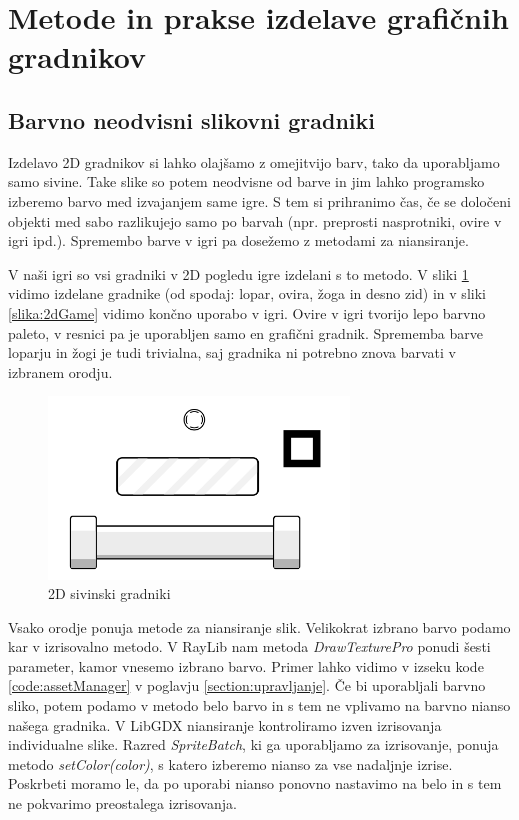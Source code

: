 \documentclass[12pt,a4paper,twoside]{book}
\begin{document}
\section{Metode in prakse izdelave grafičnih gradnikov}
\subsection{Barvno neodvisni slikovni gradniki}
Izdelavo 2D gradnikov si lahko olajšamo z omejitvijo barv, tako da uporabljamo samo sivine. Take slike so potem neodvisne od barve in jim lahko programsko izberemo barvo med izvajanjem same igre. S tem si prihranimo čas, če se določeni objekti med sabo razlikujejo samo po barvah (npr. preprosti nasprotniki, ovire v igri ipd.). Spremembo barve v igri pa dosežemo z metodami za niansiranje.

V naši igri so vsi gradniki v 2D pogledu igre izdelani s to metodo. V sliki \ref{slika:grayscaleSprites} vidimo izdelane gradnike (od spodaj: lopar, ovira, žoga in desno zid) in v sliki \ref{slika:2dGame} vidimo končno uporabo v igri. Ovire v igri tvorijo lepo barvno paleto, v resnici pa je uporabljen samo en grafični gradnik. Sprememba barve loparju in žogi je tudi trivialna, saj gradnika ni potrebno znova barvati v izbranem orodju. 

\begin{figure}[h]
	\centering
	\includegraphics[width=8cm]{grayscaleSprites}
	\caption{2D sivinski gradniki}
	\label{slika:grayscaleSprites}
\end{figure}

Vsako orodje ponuja metode za niansiranje slik. Velikokrat izbrano barvo podamo kar v izrisovalno metodo. V RayLib nam metoda \textit{DrawTexturePro} ponudi šesti parameter, kamor vnesemo izbrano barvo. Primer lahko vidimo v izseku kode \ref{code:assetManager} v poglavju \ref{section:upravljanje}. Če bi uporabljali barvno sliko, potem podamo v metodo belo barvo in s tem ne vplivamo na barvno nianso našega gradnika. V LibGDX niansiranje kontroliramo izven izrisovanja individualne slike. Razred \textit{SpriteBatch}, ki ga uporabljamo za izrisovanje, ponuja metodo \textit{setColor(color)}, s katero izberemo nianso za vse nadaljnje izrise. Poskrbeti moramo le, da po uporabi nianso ponovno nastavimo na belo in s tem ne pokvarimo preostalega izrisovanja.
\end{document}
